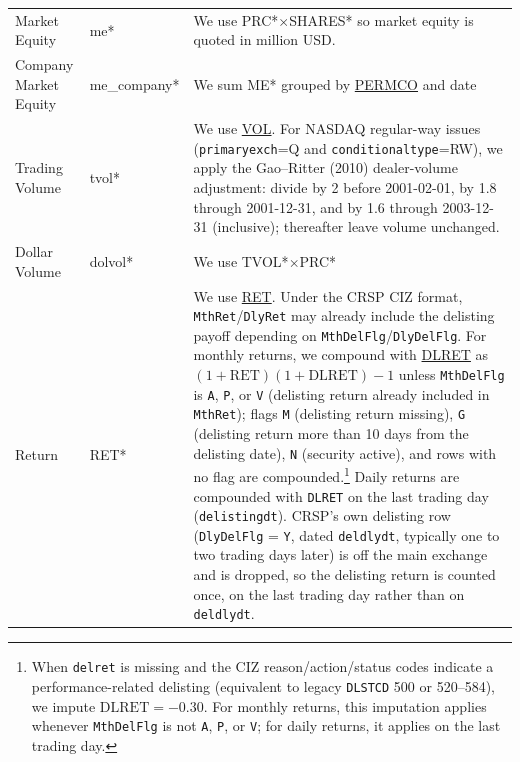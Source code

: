 \documentclass[12pt,title,fleqn]{article}
\begin{document}
{\begin{longtable}{@{\extracolsep{\fill}}|m{5cm}|l|m{8cm}|@{}}
    Market Equity & me\mbox{*} & We use PRC\mbox{*}$\times$SHARES\mbox{*} so market equity is quoted in million USD. \\
    
    Company Market Equity & me\_company\mbox{*} & We sum ME\mbox{*} grouped by 
    \href{https://wrds-www.wharton.upenn.edu/data-dictionary/form_metadata/crsp_a_stock_msf_identifyinginformation/permco/}{PERMCO} and date\\
    
    Trading Volume & tvol\mbox{*} & We use 
    \href{https://wrds-www.wharton.upenn.edu/data-dictionary/form_metadata/crsp_a_stock_msf_timeseriesinformation/vol/}{VOL}. For NASDAQ regular-way issues (\texttt{primaryexch}=Q and \texttt{conditionaltype}=RW), we apply the Gao--Ritter (2010) dealer-volume adjustment: divide by 2 before 2001-02-01, by 1.8 through 2001-12-31, and by 1.6 through 2003-12-31 (inclusive); thereafter leave volume unchanged. \\
    
    Dollar Volume & dolvol\mbox{*} & We use 
    TVOL\mbox{*}$\times$PRC\mbox{*}\\
    
    Return & RET\mbox{*} & We use
    \href{https://wrds-www.wharton.upenn.edu/data-dictionary/form_metadata/crsp_a_stock_msf_timeseriesinformation/ret/}{RET}.
    Under the CRSP CIZ format, \texttt{MthRet}/\texttt{DlyRet} may already include the delisting payoff depending on \texttt{MthDelFlg}/\texttt{DlyDelFlg}.
    For monthly returns, we compound with
    \href{https://wrds-www.wharton.upenn.edu/data-dictionary/crsp_m_stock/dsedelist/dlret/}{DLRET} as $(1+\text{RET})(1+\text{DLRET})-1$ unless \texttt{MthDelFlg} is \texttt{A}, \texttt{P}, or \texttt{V} (delisting return already included in \texttt{MthRet}); flags \texttt{M} (delisting return missing), \texttt{G} (delisting return more than 10 days from the delisting date), \texttt{N} (security active), and rows with no flag are compounded.\footnote{When \texttt{delret} is missing and the CIZ reason/action/status codes indicate a performance-related delisting (equivalent to legacy \texttt{DLSTCD} 500 or 520--584), we impute $\text{DLRET}=-0.30$. For monthly returns, this imputation applies whenever \texttt{MthDelFlg} is not \texttt{A}, \texttt{P}, or \texttt{V}; for daily returns, it applies on the last trading day.}
    Daily returns are compounded with \texttt{DLRET} on the last trading day (\texttt{delistingdt}). CRSP's own delisting row (\texttt{DlyDelFlg} = \texttt{Y}, dated \texttt{deldlydt}, typically one to two trading days later) is off the main exchange and is dropped, so the delisting return is counted once, on the last trading day rather than on \texttt{deldlydt}.\\
    

\end{longtable}}
\end{document}
